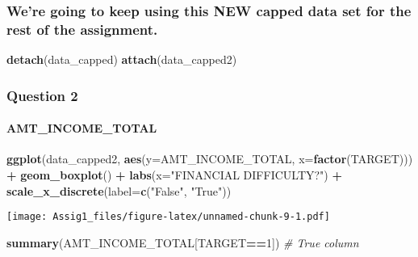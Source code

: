 \documentclass[
]{article}
\newenvironment{Shaded}{\begin{snugshade}}{\end{snugshade}}
\newcommand{\AttributeTok}[1]{\textcolor[rgb]{0.13,0.29,0.53}{#1}}
\newcommand{\CommentTok}[1]{\textcolor[rgb]{0.56,0.35,0.01}{\textit{#1}}}
\newcommand{\DecValTok}[1]{\textcolor[rgb]{0.00,0.00,0.81}{#1}}
\newcommand{\FunctionTok}[1]{\textcolor[rgb]{0.13,0.29,0.53}{\textbf{#1}}}
\newcommand{\NormalTok}[1]{#1}
\newcommand{\SpecialCharTok}[1]{\textcolor[rgb]{0.81,0.36,0.00}{\textbf{#1}}}
\newcommand{\StringTok}[1]{\textcolor[rgb]{0.31,0.60,0.02}{#1}}
\begin{document}
\hypertarget{were-going-to-keep-using-this-new-capped-data-set-for-the-rest-of-the-assignment.}{%
\subsubsection{We're going to keep using this NEW capped data set for
the rest of the
assignment.}\label{were-going-to-keep-using-this-new-capped-data-set-for-the-rest-of-the-assignment.}}

\begin{Shaded}
\begin{Highlighting}[]
\FunctionTok{detach}\NormalTok{(data\_capped)}
\FunctionTok{attach}\NormalTok{(data\_capped2)}
\end{Highlighting}
\end{Shaded}

\hypertarget{question-2}{%
\subsubsection{Question 2}\label{question-2}}

\hypertarget{amt_income_total-1}{%
\paragraph{AMT\_INCOME\_TOTAL}\label{amt_income_total-1}}

\begin{Shaded}
\begin{Highlighting}[]
\FunctionTok{ggplot}\NormalTok{(data\_capped2, }\FunctionTok{aes}\NormalTok{(}\AttributeTok{y=}\NormalTok{AMT\_INCOME\_TOTAL, }\AttributeTok{x=}\FunctionTok{factor}\NormalTok{(TARGET))) }\SpecialCharTok{+}
  \FunctionTok{geom\_boxplot}\NormalTok{() }\SpecialCharTok{+}
  \FunctionTok{labs}\NormalTok{(}\AttributeTok{x=}\StringTok{"FINANCIAL DIFFICULTY?"}\NormalTok{) }\SpecialCharTok{+}
  \FunctionTok{scale\_x\_discrete}\NormalTok{(}\AttributeTok{label=}\FunctionTok{c}\NormalTok{(}\StringTok{"False"}\NormalTok{, }\StringTok{"True"}\NormalTok{))}
\end{Highlighting}
\end{Shaded}

\texttt{[image: Assig1\_files/figure-latex/unnamed-chunk-9-1.pdf]}

\begin{Shaded}
\begin{Highlighting}[]
\FunctionTok{summary}\NormalTok{(AMT\_INCOME\_TOTAL[TARGET}\SpecialCharTok{==}\DecValTok{1}\NormalTok{]) }\CommentTok{\# True column}
\end{Highlighting}
\end{Shaded}
\end{document}
